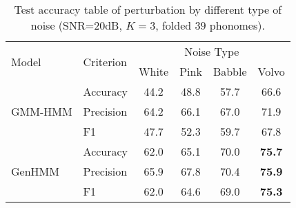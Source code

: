 \begin{table}
  \caption{Test accuracy table of perturbation by different type of noise (SNR=$20$dB, $K=3$, folded $39$ phonomes).}
  \label{tab:acc-classification39f_noise_type}
  
  \centering
  \begin{tabular}{llcccc}
    \toprule
    \multirow{2}{*}{Model} & \multirow{2}{*}{Criterion} &
                                                          \multicolumn{4}{c}{Noise Type} \\
   
    
                           &  &  White &  Pink &  Babble & Volvo  \\
    \midrule
    \multirow{3}{*}{GMM-HMM}
                           & Accuracy & 44.2 &  48.8 &  57.7 & {66.6}
    \\
                           &Precision & 64.2 &  66.1 &  67.0 & {71.9}  \\
                           & F1       & 47.7 &  52.3 &  59.7 & {67.8} \\
    \midrule
    \multirow{3}{*}{GenHMM}
                           & Accuracy & 62.0 &  65.1 &  70.0 & \textbf{75.7} \\
                           &Precision & 65.9 &  67.8 &  70.4 & \textbf{75.9}  \\
                           & F1       & 62.0 &  64.6 &  69.0 & \textbf{75.3} \\
    \bottomrule                                                                  
  \end{tabular}
  \vspace{0.3cm}
\end{table}

